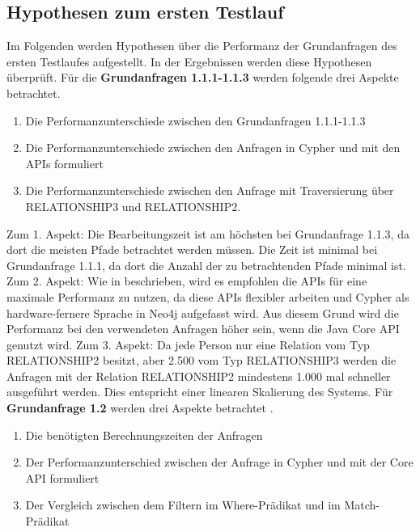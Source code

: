 \subsection{Hypothesen zum ersten Testlauf}
Im Folgenden werden Hypothesen über die Performanz der Grundanfragen des ersten Testlaufes aufgestellt. In der Ergebnissen werden diese Hypothesen überprüft. \newline \newline
Für die \textbf{Grundanfragen 1.1.1-1.1.3} werden folgende drei Aspekte betrachtet.
\begin{enumerate}
\item Die Performanzunterschiede zwischen den Grundanfragen 1.1.1-1.1.3
\item Die Performanzunterschiede zwischen den Anfragen in Cypher und mit den APIs formuliert
\item Die Performanzunterschiede zwischen den Anfrage mit Traversierung über RELATIONSHIP3 und RELATIONSHIP2.
\end{enumerate}
Zum 1. Aspekt: Die Bearbeitungszeit ist am höchsten bei Grundanfrage 1.1.3, da dort die meisten Pfade betrachtet werden müssen. Die Zeit ist minimal bei Grundanfrage 1.1.1, da dort die Anzahl der zu betrachtenden Pfade minimal ist. \newline
 Zum 2. Aspekt: Wie in \parencite{raj2015neo4j} beschrieben, wird es empfohlen die APIs für eine maximale Performanz zu nutzen, da diese APIs flexibler arbeiten und Cypher als hardware-fernere Sprache in Neo4j aufgefasst wird. Aus diesem Grund wird die Performanz bei den verwendeten Anfragen höher sein, wenn die Java Core API genutzt wird. \newline
Zum 3. Aspekt: Da jede Person nur eine Relation vom Typ RELATIONSHIP2 besitzt, aber 2.500 vom Typ RELATIONSHIP3 werden die Anfragen mit der Relation RELATIONSHIP2 mindestens 1.000 mal schneller ausgeführt werden. Dies entspricht einer linearen Skalierung des Systems. \newline \newline
Für \textbf{Grundanfrage 1.2} werden drei Aspekte betrachtet .
\begin{enumerate}
	\item Die benötigten Berechnungszeiten der Anfragen 
	\item Der Performanzunterschied zwischen der Anfrage in Cypher und mit der Core API formuliert
	\item Der Vergleich zwischen dem Filtern im Where-Prädikat und im Match-Prädikat
\end{enumerate}
